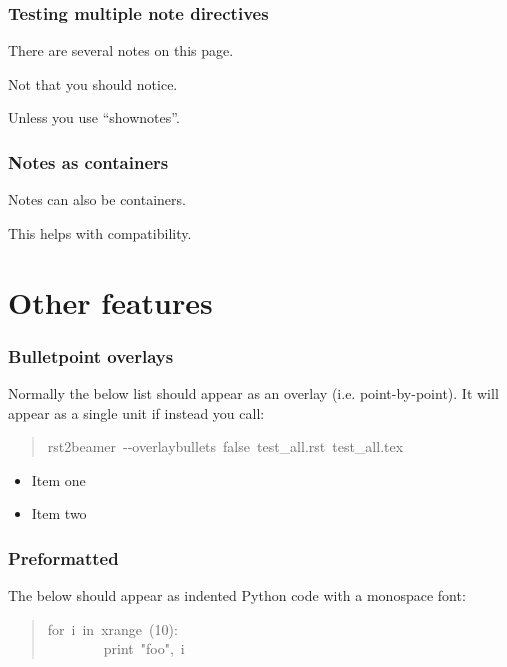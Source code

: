 \documentclass[t]{beamer}
\begin{document}
\begin{frame}[fragile]
\frametitle{Testing multiple note directives}


There are several notes on this page.

Not that you should notice.

Unless you use ``shownotes''.

\end{frame}

\begin{frame}[fragile]
\frametitle{Notes as containers}


Notes can also be containers.

This helps with compatibility.

\end{frame}


\section{Other features%
  \label{other-features}%
}

\begin{frame}[fragile]
\frametitle{Bulletpoint overlays}


Normally the below list should appear as an overlay (i.e. point-by-point). It
will appear as a single unit if instead you call:
%
\begin{quote}{\ttfamily \raggedright \noindent
rst2beamer~-{}-overlaybullets~false~test\_all.rst~test\_all.tex
}
\end{quote}
\begin{itemize}[<+-| alert@+>]

\item Item one

\item Item two
\end{itemize}

\end{frame}

\begin{frame}[fragile]
\frametitle{Preformatted}


The below should appear as indented Python code with a monospace font:
%
\begin{quote}{\ttfamily \raggedright \noindent
for~i~in~xrange~(10):\\
~~~~~~~~print~"foo",~i
}
\end{quote}

\end{frame}
\end{document}
